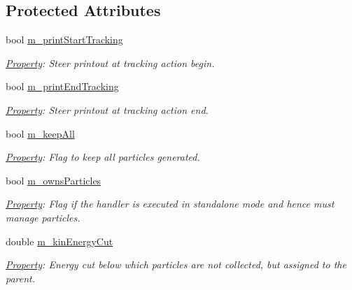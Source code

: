 \subsection*{Protected Attributes}
\begin{DoxyCompactItemize}
\item 
bool \hyperlink{class_d_d4hep_1_1_simulation_1_1_geant4_particle_handler_a1960c5fe6223f3ec578196b79a5aa088}{m\_\-printStartTracking}
\begin{DoxyCompactList}\small\item\em \hyperlink{class_d_d4hep_1_1_property}{Property}: Steer printout at tracking action begin. \item\end{DoxyCompactList}\item 
bool \hyperlink{class_d_d4hep_1_1_simulation_1_1_geant4_particle_handler_a6d1f66487284fd0d7f61633c5fd891f1}{m\_\-printEndTracking}
\begin{DoxyCompactList}\small\item\em \hyperlink{class_d_d4hep_1_1_property}{Property}: Steer printout at tracking action end. \item\end{DoxyCompactList}\item 
bool \hyperlink{class_d_d4hep_1_1_simulation_1_1_geant4_particle_handler_ab2b6cb17640a8b5cc428b2142965a4e5}{m\_\-keepAll}
\begin{DoxyCompactList}\small\item\em \hyperlink{class_d_d4hep_1_1_property}{Property}: Flag to keep all particles generated. \item\end{DoxyCompactList}\item 
bool \hyperlink{class_d_d4hep_1_1_simulation_1_1_geant4_particle_handler_a81a2c3bad5037dd9fcffdf233f7c69e2}{m\_\-ownsParticles}
\begin{DoxyCompactList}\small\item\em \hyperlink{class_d_d4hep_1_1_property}{Property}: Flag if the handler is executed in standalone mode and hence must manage particles. \item\end{DoxyCompactList}\item 
double \hyperlink{class_d_d4hep_1_1_simulation_1_1_geant4_particle_handler_ad3d0abf4ae9bc3f3176d9f05dab96cf4}{m\_\-kinEnergyCut}
\begin{DoxyCompactList}\small\item\em \hyperlink{class_d_d4hep_1_1_property}{Property}: Energy cut below which particles are not collected, but assigned to the parent. \item\end{DoxyCompactList}\item 

\end{DoxyCompactItemize}
